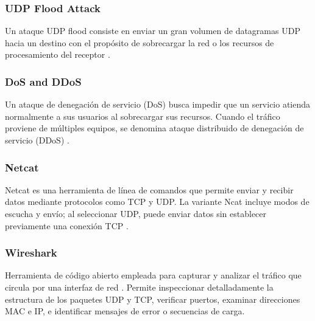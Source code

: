 \subsubsection{UDP Flood Attack}
Un ataque UDP flood consiste en enviar un gran volumen de datagramas UDP hacia un destino con el propósito de sobrecargar la red o los recursos de procesamiento del receptor \cite{gelenbe2023flood}. 

\subsubsection{DoS and DDoS}
Un ataque de denegación de servicio (DoS) busca impedir que un servicio atienda normalmente a sus usuarios al sobrecargar sus recursos. Cuando el tráfico proviene de múltiples equipos, se denomina ataque distribuido de denegación de servicio (DDoS) \cite{kurose2021}.

\subsubsection{Netcat}
Netcat es una herramienta de línea de comandos que permite enviar y recibir datos mediante protocolos como TCP y UDP. La variante Ncat incluye modos de escucha y envío; al seleccionar UDP, puede enviar datos sin establecer previamente una conexión TCP \cite{ncat_guide,rfc768}.

\subsubsection{Wireshark}
Herramienta de código abierto empleada para capturar y analizar el tráfico que circula por una interfaz de red \cite{wireshark_guide}. Permite inspeccionar detalladamente la estructura de los paquetes UDP y TCP, verificar puertos, examinar direcciones MAC e IP, e identificar mensajes de error o secuencias de carga.


%
%

